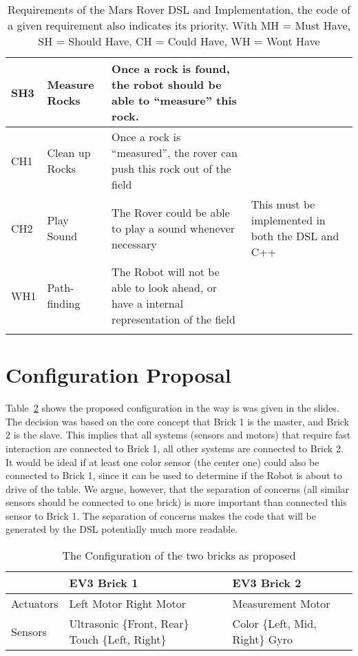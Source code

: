 \documentclass{scrartcl}
\begin{document}
\begin{longtable}{|l|p{1.7cm}|p{5cm}|p{5cm}|}
	SH3 & Measure Rocks & Once a rock is found, the robot should be able to ``measure'' this rock. & \\\hline
	CH1 & Clean up Rocks & Once a rock is ``measured'', the rover can push this rock out of the field & \\\hline
	CH2 & Play Sound & The Rover could be able to play a sound whenever necessary & This must be implemented in both the DSL and C++ \\\hline
	WH1 & Path-finding & The Robot will not be able to look ahead, or have a internal representation of the field & \\\hline
\caption{Requirements of the Mars Rover DSL and Implementation, the code of a given requirement also indicates its priority. With MH = Must Have, SH = Should Have, CH = Could Have, WH = Wont Have}
\label{tab:requirements}
\end{longtable}

\section{Configuration Proposal}
Table~\ref{tab:config} shows the proposed configuration in the way is was given in the slides.
The decision was based on the core concept that Brick 1 is the master, and Brick 2 is the slave.
This implies that all systems (sensors and motors) that require fast interaction are connected to Brick 1, all other systems are connected to Brick 2.
It would be ideal if at least one color sensor (the center one) could also be connected to Brick 1, since it can be used to determine if the Robot is about to drive of the table.
We argue, however, that the separation of concerns (all similar sensors should be connected to one brick) is more important than connected this sensor to Brick 1.
The separation of concerns makes the code that will be generated by the DSL potentially much more readable.
\begin{table}
	\centering
	\begin{tabular}{|l|p{5cm}|p{5cm}|}
		\hline
		& EV3 Brick 1 & EV3 Brick 2 \\\hline
		Actuators & Left Motor \newline Right Motor & Measurement Motor \\\hline
		Sensors & Ultrasonic \{Front, Rear\} \newline Touch \{Left, Right\} & Color \{Left, Mid, Right\} \newline Gyro \\\hline
	\end{tabular}
	\caption{The Configuration of the two bricks as proposed}
	\label{tab:config}
\end{table}
\end{document}
